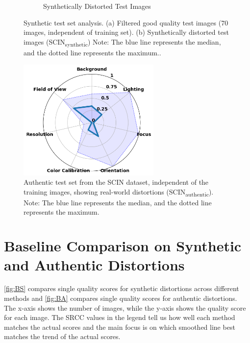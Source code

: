 \begin{figure}[ht]
\begin{subfigure}[b]{0.45\textwidth}
        \caption{Synthetically Distorted Test Images}
        \label{fig:test_70_synthetic}
    \end{subfigure}
    \hfill
    \caption{Synthetic test set analysis. (a) Filtered good quality test images (70 images, independent of training set). (b) Synthetically distorted test images (SCIN\textsubscript{synthetic}) Note: The blue line represents the median, and the dotted line represents the maximum..}
    \label{fig:T1}
\end{figure}
\vspace{\baselineskip}
\begin{figure}[ht]
    \centering
    \includegraphics[keepaspectratio,width=7cm]{img/hept/test_200.png}
    \caption{Authentic test set from the SCIN dataset, independent of the training images, showing real-world distortions (SCIN\textsubscript{authentic}). Note: The blue line represents the median, and the dotted line represents the maximum.}
    \label{fig:T2}
\end{figure}

\clearpage
\section{Baseline Comparison on Synthetic and Authentic Distortions}
\label{sec:ComparisonARNIQA}
\autoref{fig:BS} compares single quality scores for synthetic distortions across different methods and \autoref{fig:BA} compares single quality scores for authentic distortions. The x-axis shows the number of images, while the y-axis shows the quality score for each image. The SRCC values in the legend tell us how well each method matches the actual scores and the main focus is on which smoothed line best matches the trend of the actual scores. \par

